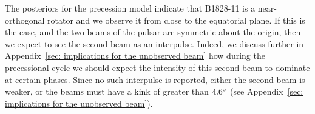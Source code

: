 \documentclass[../full_thesis/full_thesis.tex]{subfiles}
\begin{document}
The posteriors for the precession model indicate that B1828-11 is a
near-orthogonal rotator and we observe it from close to the equatorial plane.
If this is the case, and the two beams of the pulsar are symmetric about the
origin, then we expect to see the second beam as an interpulse. Indeed, we
discuss further in Appendix~\ref{sec: implications for the unobserved beam} how
during the precessional cycle we should expect the intensity of this second
beam to dominate at certain phases. Since no such interpulse is reported,
either the second beam is weaker, or the beams must have a kink of greater than
$4.6^{\circ}$ (see Appendix~\ref{sec: implications for the unobserved beam}).


\biblio
\end{document}
